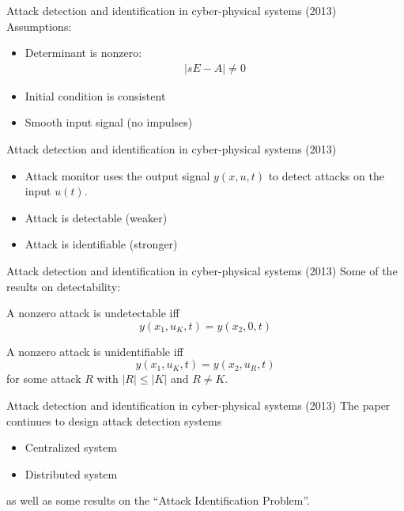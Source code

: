 \documentclass[compress]{beamer}
\begin{document}
\begin{frame}{Attack detection and identification in cyber-physical systems
    (2013)}
    Assumptions:
    \begin{itemize}
        \item Determinant is nonzero:
    \begin{equation}
        \begin{split}
            |sE-A|\neq 0
        \end{split}
        \label{}
    \end{equation}
\item Initial condition is consistent
\item Smooth input signal (no impulses)
    \end{itemize}

\end{frame}
\begin{frame}{Attack detection and identification in cyber-physical systems
    (2013)}
    \begin{itemize}
        \item Attack monitor uses the output signal $y(x,u,t)$ to detect attacks
            on the input $u(t)$.
        \item Attack is detectable (weaker)
        \item Attack is identifiable (stronger)
    \end{itemize}

\end{frame}
\begin{frame}{Attack detection and identification in cyber-physical systems
    (2013)}
   Some of the results on detectability:
   \begin{theorem}
       A nonzero attack is undetectable iff
       \begin{equation}
           y(x_1,u_K,t)=y(x_2,0,t)
           \label{}
       \end{equation}
   \end{theorem}
   \begin{theorem}
       A nonzero attack is unidentifiable iff
       \begin{equation}
           y(x_1,u_K,t)=y(x_2,u_R,t)
           \label{}
       \end{equation}
       for some attack $R$ with $|R|\leq |K|$ and $R\neq K$.
   \end{theorem}
\end{frame}

\begin{frame}{Attack detection and identification in cyber-physical systems
    (2013)}
        The paper continues to design attack detection systems
        \begin{itemize}
            \item Centralized system
            \item Distributed system
        \end{itemize}
        as well as some results on the \enquote{Attack Identification Problem}.
\end{frame}
\end{document}
